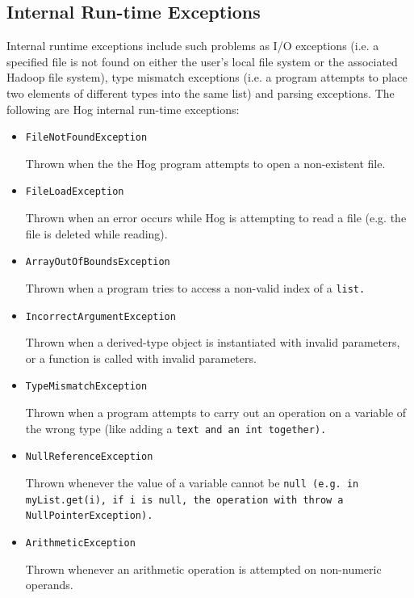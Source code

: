 \documentclass{book}
\begin{document}

\subsection{Internal Run-time Exceptions} %
\label{sub:internal_run_time_exceptions}

Internal run­time exceptions include such problems as I/O exceptions (i.e. a
specified file is not found on either the user’s local file system or the
associated Hadoop file system), type mismatch exceptions (i.e. a program
attempts to place two elements of different types into the same list) and
parsing exceptions. The following are Hog internal run-­time exceptions:


\begin{itemize}
  \item[] \tt FileNotFoundException \rm
  
  Thrown when the the Hog program attempts to open a non-existent file.
  
  \item[] \tt FileLoadException \rm
  
  Thrown when an error occurs while Hog is attempting to read a file (e.g. the
file is deleted while reading).
  
  \item[] \tt ArrayOutOfBoundsException \rm
  
  Thrown when a program tries to access a non-valid index of a \tt list\rm.
  
  \item[] \tt IncorrectArgumentException \rm
  
  Thrown when a derived-type object is instantiated with invalid parameters, or
a function is called with invalid parameters.
  
  \item[] \tt TypeMismatchException \rm
  
  Thrown when a program attempts to carry out an operation on a variable of the
wrong type (like adding a \tt text \rm and an \tt int \rm together).
    
  \item[] \tt NullReferenceException \rm
  
  Thrown whenever the value of a variable cannot be \tt null \rm (e.g. in \tt
myList.get(i)\rm, if \tt i \rm is \tt null\rm, the operation with throw a \tt
NullPointerException\rm).
  
  \item[] \tt ArithmeticException \rm
  
  Thrown whenever an arithmetic operation is attempted on non-numeric operands.
  
\end{itemize}
\end{document}
